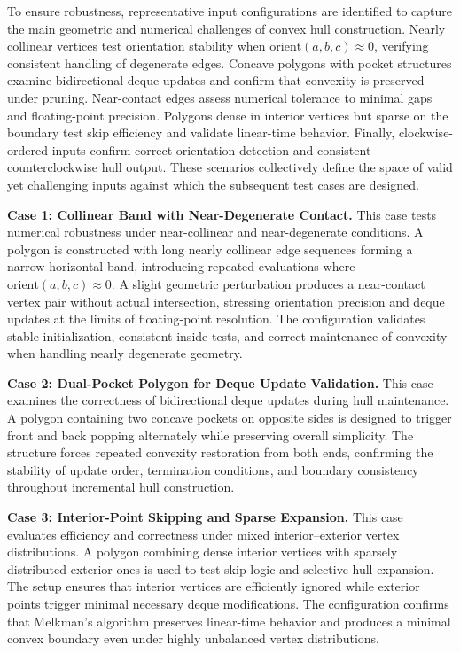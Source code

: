 \documentclass{article}
\begin{document}


To ensure robustness, representative input configurations are identified to capture the main geometric and numerical challenges of convex hull construction.  
Nearly collinear vertices test orientation stability when \(\text{orient}(a,b,c)\!\approx\!0\), verifying consistent handling of degenerate edges.  
Concave polygons with pocket structures examine bidirectional deque updates and confirm that convexity is preserved under pruning.  
Near-contact edges assess numerical tolerance to minimal gaps and floating-point precision.  
Polygons dense in interior vertices but sparse on the boundary test skip efficiency and validate linear-time behavior.  
Finally, clockwise-ordered inputs confirm correct orientation detection and consistent counterclockwise hull output.  
These scenarios collectively define the space of valid yet challenging inputs against which the subsequent test cases are designed.


\textbf{Case 1: Collinear Band with Near-Degenerate Contact.}  
This case tests numerical robustness under near-collinear and near-degenerate conditions.  
A polygon is constructed with long nearly collinear edge sequences forming a narrow horizontal band, introducing repeated evaluations where \(\text{orient}(a,b,c)\!\approx\!0\).  
A slight geometric perturbation produces a near-contact vertex pair without actual intersection, stressing orientation precision and deque updates at the limits of floating-point resolution.  
The configuration validates stable initialization, consistent inside-tests, and correct maintenance of convexity when handling nearly degenerate geometry.

\textbf{Case 2: Dual-Pocket Polygon for Deque Update Validation.}  
This case examines the correctness of bidirectional deque updates during hull maintenance.  
A polygon containing two concave pockets on opposite sides is designed to trigger front and back popping alternately while preserving overall simplicity.  
The structure forces repeated convexity restoration from both ends, confirming the stability of update order, termination conditions, and boundary consistency throughout incremental hull construction.

\textbf{Case 3: Interior-Point Skipping and Sparse Expansion.}  
This case evaluates efficiency and correctness under mixed interior–exterior vertex distributions.  
A polygon combining dense interior vertices with sparsely distributed exterior ones is used to test skip logic and selective hull expansion.  
The setup ensures that interior vertices are efficiently ignored while exterior points trigger minimal necessary deque modifications.  
The configuration confirms that Melkman’s algorithm preserves linear-time behavior and produces a minimal convex boundary even under highly unbalanced vertex distributions.
\end{document}
